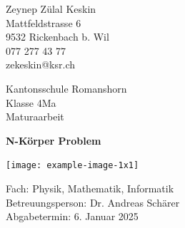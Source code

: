 \documentclass[a4paper,12pt,twoside]{article}
\begin{document}



\begin{titlepage}
	\clearpage\thispagestyle{empty}	
	
	\begin{minipage}[t]{\textwidth}
		\begin{minipage}[t]{0.5\textwidth}
			Zeynep Zülal Keskin\\
			Mattfeldstrasse 6\\
			9532 Rickenbach b. Wil\\
			077 277 43 77\\
			zekeskin@ksr.ch
		\end{minipage}
		\begin{minipage}[t]{0.5\textwidth}
			\begin{flushright}
				Kantonsschule Romanshorn\\
				Klasse 4Ma\\
				Maturaarbeit
			\end{flushright}
		\end{minipage}
	\end{minipage}
	
	\vspace{4cm}
	{
		\centering
		\Huge\bfseries N-Körper Problem\par
		\vspace{1cm}
		\texttt{[image: example-image-1x1]}\par
	}
	
	\vspace{9cm}	
	\noindent
    Fach: Physik, Mathematik, Informatik \noindent\\
	Betreuungsperson: Dr. Andreas Schärer\\
	Abgabetermin: 6. Januar 2025
	
\end{titlepage}


\end{document}
